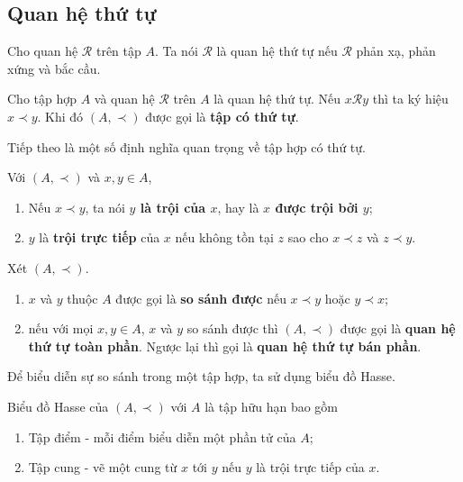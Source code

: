 \documentclass{mynotes}
\begin{document}
\subsection*{Quan hệ thứ tự}

\begin{definition}
    Cho quan hệ $\mathcal{R}$ trên tập $A$. Ta nói $\mathcal{R}$ là quan hệ thứ tự nếu $\mathcal{R}$ phản xạ,  phản xứng và bắc cầu.
\end{definition}

\begin{definition}
    Cho tập hợp $A$ và quan hệ $\mathcal{R}$ trên $A$ là quan hệ thứ tự. Nếu $x \mathcal{R} y$ thì ta ký hiệu $x \prec y$. Khi đó $(A, \prec)$ được gọi là \textbf{tập có  thứ tự}.
\end{definition}

Tiếp theo là một số định nghĩa quan trọng về tập hợp có thứ tự.

\begin{definition}
    Với $(A, \prec)$ và $x, y \in A$,
    \begin{enumerate}
        \item Nếu $x \prec y$, ta nói \textbf{$y$ là trội của $x$}, hay là \textbf{$x$ được trội bởi $y$};
        \item $y$ là \textbf{trội trực tiếp} của $x$ nếu không tồn tại $z$ sao cho $x \prec z$ và $z \prec y$.
    \end{enumerate}
\end{definition}

\begin{definition}
    Xét $(A, \prec)$.
    \begin{enumerate}
        \item $x$ và $y$ thuộc $A$ được gọi là \textbf{so sánh được} nếu $x \prec y$ hoặc $y \prec x$;
        \item nếu với mọi $x, y \in A$, $x$ và $y$ so sánh được thì $(A, \prec)$ được gọi là \textbf{quan hệ thứ tự toàn phần}. Ngược lại thì gọi là \textbf{quan hệ thứ tự bán phần}.
    \end{enumerate}
\end{definition}

Để biểu diễn sự so sánh trong một tập hợp, ta sử dụng biểu đồ Hasse.

\begin{definition}
    Biểu đồ Hasse của $(A, \prec)$ với $A$ là tập hữu hạn bao gồm
    \begin{enumerate}
        \item Tập điểm - mỗi điểm biểu diễn một phần tử của $A$;
        \item Tập cung - vẽ một cung từ $x$ tới $y$ nếu $y$ là trội trực tiếp của $x$.
    \end{enumerate}
\end{definition}
\end{document}

